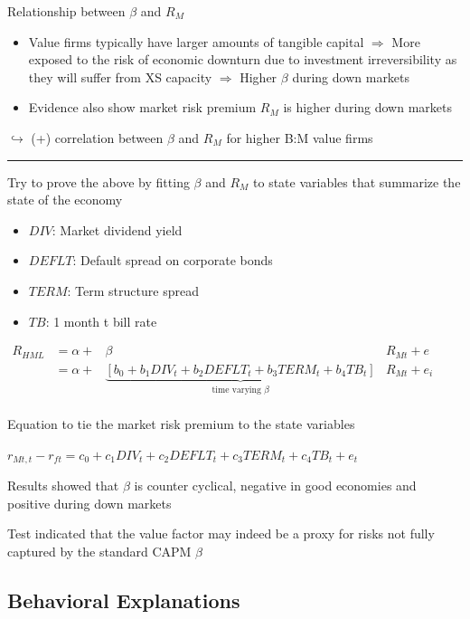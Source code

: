 \documentclass[]{book}
\providecommand{\tightlist}{%
  \setlength{\itemsep}{0pt}\setlength{\parskip}{0pt}}
\theoremstyle{definition}
\theoremstyle{definition}
\theoremstyle{remark}
\begin{document}
Relationship between \(\beta\) and \(R_M\)

\begin{itemize}
\item
  Value firms typically have larger amounts of tangible capital
  \(\Rightarrow\) More exposed to the risk of economic downturn due to
  investment irreversibility as they will suffer from XS capacity
  \(\Rightarrow\) Higher \(\beta\) during down markets
\item
  Evidence also show market risk premium \(R_M\) is higher during down
  markets
\end{itemize}

\(\hookrightarrow\) (+) correlation between \(\beta\) and \(R_M\) for
higher B:M value firms

\begin{center}\rule{0.5\linewidth}{\linethickness}\end{center}

Try to prove the above by fitting \(\beta\) and \(R_M\) to state
variables that summarize the state of the economy

\begin{itemize}
\tightlist
\item
  \(DIV\): Market dividend yield
\item
  \(DEFLT\): Default spread on corporate bonds
\item
  \(TERM\): Term structure spread
\item
  \(TB\): 1 month t bill rate
\end{itemize}

\(\begin{array}{cccc}  R_{HML} &= \alpha + &\beta &R_{Mt} + e \\  &= \alpha + &\underbrace{[b_0 + b_1 DIV_t + b_2 DEFLT_t + b_3 TERM_t + b_4 TB_t]}_{\text{time varying }\beta} &R_{Mt} + e_i \\ \end{array}\)

Equation to tie the market risk premium to the state variables

\(r_{Mt,t} - r_{ft} = c_0 + c_1 DIV_t + c_2 DEFLT_t + c_3 TERM_t + c_4 TB_t + e_t\)

Results showed that \(\beta\) is counter cyclical, negative in good
economies and positive during down markets

Test indicated that the value factor may indeed be a proxy for risks not
fully captured by the standard CAPM \(\beta\)

\subsection{Behavioral Explanations}\label{behavioral-explanations}
\end{document}
